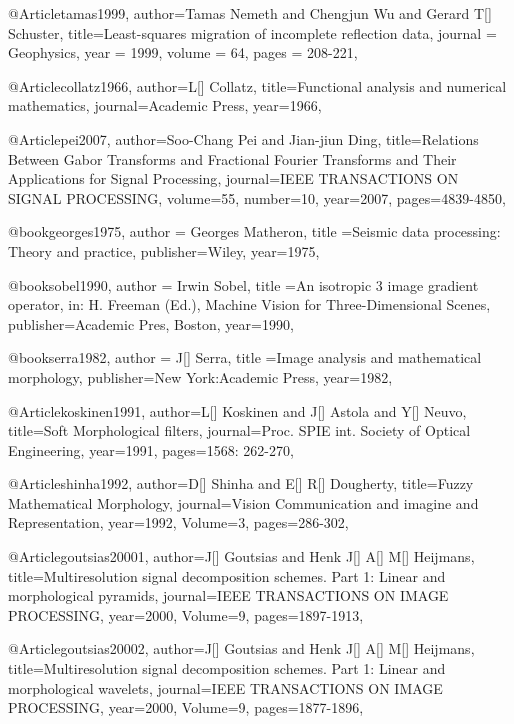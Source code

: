 @Article{tamas1999,
  author={Tamas Nemeth and Chengjun Wu and Gerard T[] Schuster},
  title={Least-squares migration of incomplete reflection data},
  journal = 	 {Geophysics},
  year = 	 1999,
  volume =	 64,
  pages =	 {208-221},
}

@Article{collatz1966,
author={L[] Collatz},
title={Functional analysis and numerical mathematics},
journal={Academic Press},
year=1966,
}

@Article{pei2007,
author={Soo-Chang Pei and Jian-jiun Ding},
title={Relations Between Gabor Transforms and Fractional Fourier Transforms and Their Applications for Signal Processing},
journal={IEEE TRANSACTIONS ON SIGNAL PROCESSING},
volume=55,
number=10,
year=2007,
pages={4839-4850},
}

@book{georges1975,
  author = {Georges Matheron},
  title ={Seismic data processing: Theory and practice},
  publisher={Wiley},
  year=1975,
}


@book{sobel1990,
  author = {Irwin Sobel},
  title ={An isotropic 3 image gradient operator, in: H. Freeman (Ed.), Machine Vision for Three-Dimensional Scenes},
  publisher={Academic Pres, Boston},
  year=1990,
}




@book{serra1982,
  author = {J[] Serra},
  title ={Image analysis and mathematical morphology},
  publisher={New York:Academic Press},
  year=1982,
}

@Article{koskinen1991,
  author={L[] Koskinen and J[] Astola and Y[] Neuvo},
  title={Soft Morphological filters},
  journal={Proc. SPIE int. Society of Optical Engineering},
  year=1991,
  pages={1568: 262-270},
}

@Article{shinha1992,
  author={D[] Shinha and E[] R[] Dougherty},
  title={Fuzzy Mathematical Morphology},
  journal={Vision Communication and imagine and Representation},
  year=1992,
  Volume=3,
  pages={286-302},
}

@Article{goutsias20001,
  author={J[] Goutsias and Henk J[] A[] M[] Heijmans},
  title={Multiresolution signal decomposition schemes. Part 1: Linear and morphological pyramids},
  journal={IEEE TRANSACTIONS ON IMAGE PROCESSING},
  year=2000,
  Volume=9,
  pages={1897-1913},
}

@Article{goutsias20002,
  author={J[] Goutsias and Henk J[] A[] M[] Heijmans},
  title={Multiresolution signal decomposition schemes. Part 1: Linear and morphological wavelets},
  journal={IEEE TRANSACTIONS ON IMAGE PROCESSING},
  year=2000,
  Volume=9,
  pages={1877-1896},
}


